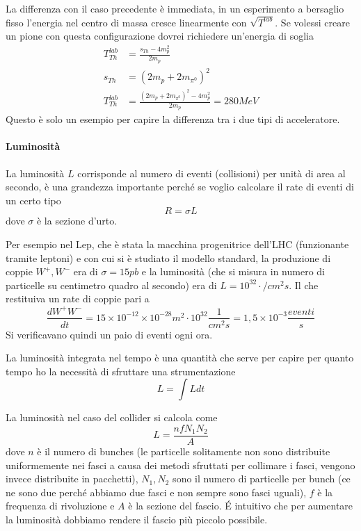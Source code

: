 \begin{itemize}
La differenza con il caso precedente è immediata, in un esperimento a bersaglio fisso l'energia nel centro di massa cresce linearmente con $\sqrt{T^{lab}}$.
Se volessi creare un pione con questa configurazione dovrei richiedere un'energia di soglia
\begin{equation}
\begin{split}
T^{lab}_{Th}&=\frac{s_{Th}-4m_p^2}{2m_p}\\
s_{Th}&=(2m_p+2m_{\pi^0})^2\\
T^{lab}_{Th}&=\frac{(2m_p+2m_{\pi^0})^2-4m_p^2}{2m_p}=280MeV
\end{split}
\end{equation}
Questo è solo un esempio per capire la differenza tra i due tipi di acceleratore.
\end{itemize}

\paragraph{Luminosità}
La luminosità $L$ corrisponde al numero di eventi (collisioni) per unità di area al secondo, è una grandezza importante perché se voglio calcolare il rate di eventi di un certo tipo 
\begin{equation}
R=\sigma L
\end{equation}
dove $\sigma$ è la sezione d'urto.

Per esempio nel Lep, che è stata la macchina progenitrice dell'LHC (funzionante tramite leptoni) e con cui si è studiato il modello standard, la produzione di coppie $W^+, W^-$ era di $\sigma=15pb$ e la luminosità (che si misura in numero di particelle su centimetro quadro al secondo) era di $L=10^{32}\cdot/cm^2s$.
Il che restituiva un rate di coppie pari a 
\begin{equation}
\frac{dW^+W^-}{dt}=15\times 10^{-12}\times 10^{-28}m^2\cdot 10^{32}\frac{1}{cm^2s}=1,5\times 10^{-3}\frac{eventi}{s}
\end{equation}
Si verificavano quindi un paio di eventi ogni ora.

La luminosità integrata nel tempo è una quantità che serve per capire per quanto tempo ho la necessità di sfruttare una strumentazione
\begin{equation}
L=\int Ldt
\end{equation}

La luminosità nel caso del collider si calcola come
\begin{equation}
L=\frac{nfN_1N_2}{A}
\end{equation}
dove $n$ è il numero di bunches (le particelle solitamente non sono distribuite uniformemente nei fasci a causa dei metodi sfruttati per collimare i fasci, vengono invece distribuite in pacchetti), $N_1, N_2$ sono il numero di particelle per bunch (ce ne sono due perché abbiamo due fasci e non sempre sono fasci uguali), $f$ è la frequenza di rivoluzione e $A$ è la sezione del fascio.
\'E intuitivo che per aumentare la luminosità dobbiamo rendere il fascio più piccolo possibile.

